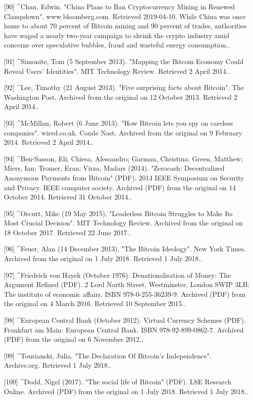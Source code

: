 [90]
^Chan, Edwin. "China Plans to Ban Cryptocurrency Mining in Renewed Clampdown". www.bloomberg.com. Retrieved 2019-04-10. While China was once home to about 70 percent of Bitcoin mining and 90 percent of trades, authorities have waged a nearly two-year campaign to shrink the crypto industry amid concerns over speculative bubbles, fraud and wasteful energy consumption..

[91]
^Simonite, Tom (5 September 2013). "Mapping the Bitcoin Economy Could Reveal Users' Identities". MIT Technology Review. Retrieved 2 April 2014..

[92]
^Lee, Timothy (21 August 2013). "Five surprising facts about Bitcoin". The Washington Post. Archived from the original on 12 October 2013. Retrieved 2 April 2014..

[93]
^McMillan, Robert (6 June 2013). "How Bitcoin lets you spy on careless companies". wired.co.uk. Conde Nast. Archived from the original on 9 February 2014. Retrieved 2 April 2014..

[94]
^Ben-Sasson, Eli; Chiesa, Alessandro; Garman, Christina; Green, Matthew; Miers, Ian; Tromer, Eran; Virza, Madars (2014). "Zerocash: Decentralized Anonymous Payments from Bitcoin" (PDF). 2014 IEEE Symposium on Security and Privacy. IEEE computer society. Archived (PDF) from the original on 14 October 2014. Retrieved 31 October 2014..

[95]
^Orcutt, Mike (19 May 2015). "Leaderless Bitcoin Struggles to Make Its Most Crucial Decision". MIT Technology Review. Archived from the original on 18 October 2017. Retrieved 22 June 2017..

[96]
^Feuer, Alan (14 December 2013). "The Bitcoin Ideology". New York Times. Archived from the original on 1 July 2018. Retrieved 1 July 2018..

[97]
^Friedrich von Hayek (October 1976). Denationalisation of Money: The Argument Refined (PDF). 2 Lord North Street, Westminster, London SWIP 3LB: The institute of economic affairs. ISBN 978-0-255-36239-9. Archived (PDF) from the original on 4 March 2016. Retrieved 10 September 2015..

[98]
^European Central Bank (October 2012). Virtual Currency Schemes (PDF). Frankfurt am Main: European Central Bank. ISBN 978-92-899-0862-7. Archived (PDF) from the original on 6 November 2012..

[99]
^Tourianski, Julia. "The Declaration Of Bitcoin's Independence". Archive.org. Retrieved 1 July 2018..

[100]
^Dodd, Nigel (2017). "The social life of Bitcoin" (PDF). LSE Research Online. Archived (PDF) from the original on 1 July 2018. Retrieved 1 July 2018..


